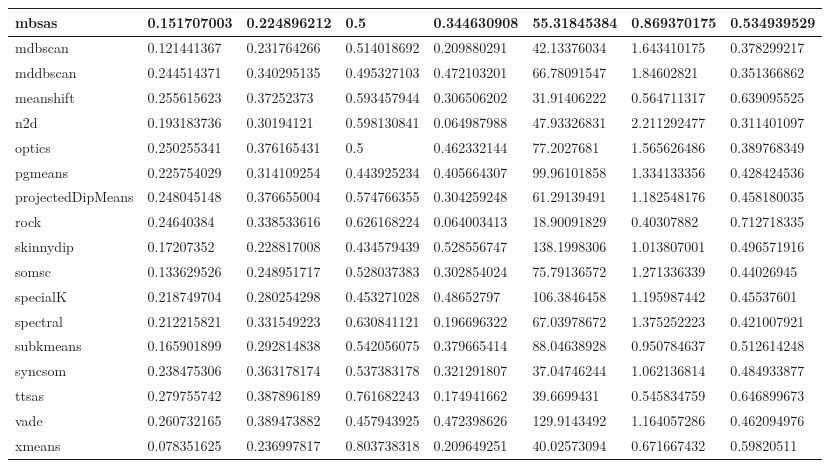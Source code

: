 \begin{table}[H]
\begin{tabular}{|l|l|l|l|l|l|l|l|}
\hline
mbsas & 0.151707003 & 0.224896212 & 0.5 & 0.344630908 & 55.31845384 & 0.869370175 & 0.534939529 \\
\hline
mdbscan & 0.121441367 & 0.231764266 & 0.514018692 & 0.209880291 & 42.13376034 & 1.643410175 & 0.378299217 \\
\hline
mddbscan & 0.244514371 & 0.340295135 & 0.495327103 & 0.472103201 & 66.78091547 & 1.84602821 & 0.351366862 \\
\hline
meanshift & 0.255615623 & 0.37252373 & 0.593457944 & 0.306506202 & 31.91406222 & 0.564711317 & 0.639095525 \\
\hline
n2d & 0.193183736 & 0.30194121 & 0.598130841 & 0.064987988 & 47.93326831 & 2.211292477 & 0.311401097 \\
\hline
optics & 0.250255341 & 0.376165431 & 0.5 & 0.462332144 & 77.2027681 & 1.565626486 & 0.389768349 \\
\hline
pgmeans & 0.225754029 & 0.314109254 & 0.443925234 & 0.405664307 & 99.96101858 & 1.334133356 & 0.428424536 \\
\hline
projectedDipMeans & 0.248045148 & 0.376655004 & 0.574766355 & 0.304259248 & 61.29139491 & 1.182548176 & 0.458180035 \\
\hline
rock & 0.24640384 & 0.338533616 & 0.626168224 & 0.064003413 & 18.90091829 & 0.40307882 & 0.712718335 \\
\hline
skinnydip & 0.17207352 & 0.228817008 & 0.434579439 & 0.528556747 & 138.1998306 & 1.013807001 & 0.496571916 \\
\hline
somsc & 0.133629526 & 0.248951717 & 0.528037383 & 0.302854024 & 75.79136572 & 1.271336339 & 0.44026945 \\
\hline
specialK & 0.218749704 & 0.280254298 & 0.453271028 & 0.48652797 & 106.3846458 & 1.195987442 & 0.45537601 \\
\hline
spectral & 0.212215821 & 0.331549223 & 0.630841121 & 0.196696322 & 67.03978672 & 1.375252223 & 0.421007921 \\
\hline
subkmeans & 0.165901899 & 0.292814838 & 0.542056075 & 0.379665414 & 88.04638928 & 0.950784637 & 0.512614248 \\
\hline
syncsom & 0.238475306 & 0.363178174 & 0.537383178 & 0.321291807 & 37.04746244 & 1.062136814 & 0.484933877 \\
\hline
ttsas & 0.279755742 & 0.387896189 & 0.761682243 & 0.174941662 & 39.6699431 & 0.545834759 & 0.646899673 \\
\hline
vade & 0.260732165 & 0.389473882 & 0.457943925 & 0.472398626 & 129.9143492 & 1.164057286 & 0.462094976 \\
\hline
xmeans & 0.078351625 & 0.236997817 & 0.803738318 & 0.209649251 & 40.02573094 & 0.671667432 & 0.59820511 \\
\hline
\end{tabular}
\end{table}